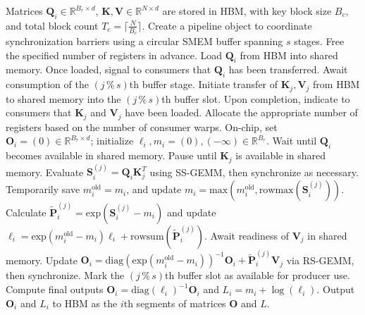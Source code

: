 \begin{enumerate}
\begin{algorithm}[H]
    \caption{\small\label{alg:flash3_wgmma_ws_only}\textsc{FlashAttention-3} forward pass \textbf{excluding} intra-consumer overlap -- CTA view}
    \begin{algorithmic}[1]
\REQUIRE Matrices $\mathbf{Q}_i \in \mathbb{R}^{B_r \times d}$, $\mathbf{K}, \mathbf{V} \in \mathbb{R}^{N \times d}$ are stored in HBM, with key block size $B_c$, and total block count $T_c = \lceil \frac{N}{B_c} \rceil$.
\STATE Create a pipeline object to coordinate synchronization barriers using a circular SMEM buffer spanning $s$ stages.
\STATE Free the specified number of registers in advance.
\STATE Load $\mathbf{Q}_i$ from HBM into shared memory.
\STATE Once loaded, signal to consumers that $\mathbf{Q}_i$ has been transferred.
    \STATE Await consumption of the $(j\,\%\,s)$th buffer stage.
    \STATE Initiate transfer of $\mathbf{K}_j, \mathbf{V}_j$ from HBM to shared memory into the $(j\,\%\,s)$th buffer slot.
    \STATE Upon completion, indicate to consumers that $\mathbf{K}_j$ and $\mathbf{V}_j$ have been loaded.
\ENDFOR
\ELSE 
\STATE Allocate the appropriate number of registers based on the number of consumer warps.
\STATE On-chip, set $\mathbf{O}_i = (0) \in \mathbb{R}^{B_r \times d}$; initialize $\ell_i, m_i = (0), (-\infty) \in \mathbb{R}^{B_r}$.
\STATE Wait until $\mathbf{Q}_i$ becomes available in shared memory.
\STATE Pause until $\mathbf{K}_j$ is available in shared memory.
\STATE Evaluate $\mathbf{S}_i^{(j)} = \mathbf{Q}_i \mathbf{K}_j^T$ using SS-GEMM, then synchronize as necessary. \label{alg:ws_only_gemm1}
\STATE Temporarily save $m_i^{\mathrm{old}} = m_i$, and update $m_i = \mathrm{max}(m_i^{\mathrm{old}}, \mathrm{rowmax}(\mathbf{S}_i^{(j)}))$. \label{code-ws:softmax_start}
\STATE Calculate $\widetilde{\mathbf{P}}_i^{(j)} = \mathrm{exp}(\mathbf{S}_i^{(j)} - m_i)$ and update $\ell_i = \mathrm{exp}(m_i^{\mathrm{old}} - m_i) \ell_i + \mathrm{rowsum}(\widetilde{\mathbf{P}}_i^{(j)})$. \label{code-ws:softmax_end}
\STATE Await readiness of $\mathbf{V}_j$ in shared memory.
\STATE Update $\mathbf{O}_i = \mathrm{diag}(\mathrm{exp}(m_i^{\mathrm{old}} - m_i))^{-1} \mathbf{O}_i + \widetilde{\mathbf{P}}_i^{(j)} \mathbf{V}_j$ via RS-GEMM, then synchronize. \label{alg:ws_only_gemm2}
\STATE Mark the $(j\,\%\,s)$th buffer slot as available for producer use.
\ENDFOR
\STATE Compute final outputs $\mathbf{O}_i = \mathrm{diag}(\ell_i)^{-1} \mathbf{O}_i$ and $L_i = m_i + \log(\ell_i)$.
\STATE Output $\mathbf{O}_i$ and $L_i$ to HBM as the $i$th segments of matrices $\mathbf{O}$ and $L$.
\ENDIF
\end{algorithmic}
\end{algorithm}


\end{enumerate}
